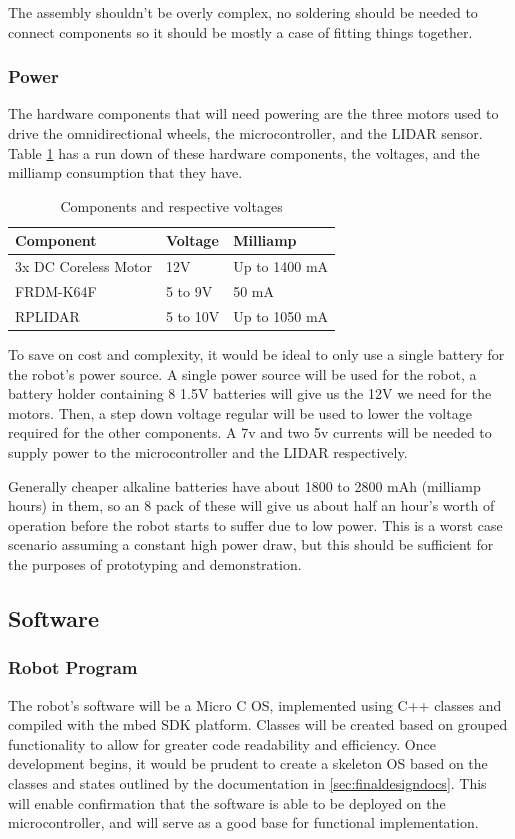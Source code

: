 				The assembly shouldn't be overly complex, no soldering should be needed to connect components so it should be mostly a case of fitting things together.
				
				\subsubsection{Power}
				The hardware components that will need powering are the three motors used to drive the omnidirectional wheels, the microcontroller, and the LIDAR sensor. Table \ref{table:1} has a run down of these hardware components, the voltages, and the milliamp consumption that they have.
				
				\begin{table}[h]
					\centering
					\begin{tabular}{| l | l | l |} 
						\hline
						Component & Voltage & Milliamp \\ [0.5ex] 
						\hline
						3x DC Coreless Motor  & 12V & Up to 1400 mA  \\ 
						FRDM-K64F  & 5 to 9V &  50 mA \\
						RPLIDAR  & 5 to 10V & Up to 1050 mA\\
						\hline
					\end{tabular}
					\caption{Components and respective voltages}
					\label{table:1}
				\end{table}
				
				To save on cost and complexity, it would be ideal to only use a single battery for the robot's power source. A single power source will be used for the robot, a battery holder containing 8 1.5V batteries will give us the 12V we need for the motors. Then, a step down voltage regular will be used to lower the voltage required for the other components. A 7v and two 5v currents will be needed to supply power to the microcontroller and the LIDAR respectively.
				
				Generally cheaper alkaline batteries have about 1800 to 2800 mAh (milliamp hours) in them, so an 8 pack of these will give us about half an hour's worth of operation before the robot starts to suffer due to low power. This is a worst case scenario assuming a constant high power draw, but this should be sufficient for the purposes of prototyping and demonstration. 
				
			\subsection{Software}
				\subsubsection{Robot Program}
				The robot's software will be a Micro C OS, implemented using C++ classes and compiled with the mbed SDK platform. Classes will be created based on grouped functionality to allow for greater code readability and efficiency. Once development begins, it would be prudent to create a skeleton OS based on the classes and states outlined by the documentation in \ref{sec:finaldesigndocs}. This will enable confirmation that the software is able to be deployed on the microcontroller, and will serve as a good base for functional implementation.
		

